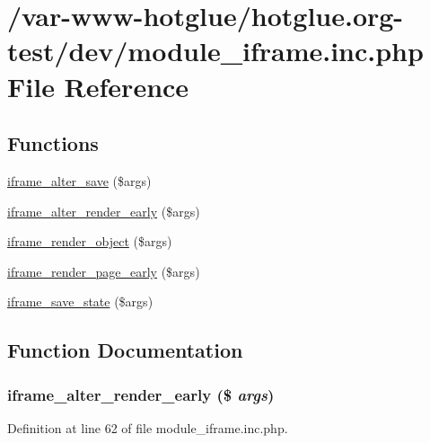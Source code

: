 \hypertarget{module__iframe_8inc_8php}{
\section{/var-\/www-\/hotglue/hotglue.org-\/test/dev/module\_\-iframe.inc.php File Reference}
\label{module__iframe_8inc_8php}
}
\subsection*{Functions}
\begin{DoxyCompactItemize}
\item 
\hyperlink{module__iframe_8inc_8php_a2db93d83522681e256287e019fe40abc}{iframe\_\-alter\_\-save} (\$args)
\item 
\hyperlink{module__iframe_8inc_8php_a7a5d09a45f06d9fd866f3c7679c14db2}{iframe\_\-alter\_\-render\_\-early} (\$args)
\item 
\hyperlink{module__iframe_8inc_8php_a40856482f79fb837bc538e8eed66aff4}{iframe\_\-render\_\-object} (\$args)
\item 
\hyperlink{module__iframe_8inc_8php_ad4d8fd8256a19beb570193c2886659e5}{iframe\_\-render\_\-page\_\-early} (\$args)
\item 
\hyperlink{module__iframe_8inc_8php_a3034fcc475334b511b91932918fcfe57}{iframe\_\-save\_\-state} (\$args)
\end{DoxyCompactItemize}


\subsection{Function Documentation}
\hypertarget{module__iframe_8inc_8php_a7a5d09a45f06d9fd866f3c7679c14db2}{
\subsubsection[{iframe\_\-alter\_\-render\_\-early}]{\setlength{\rightskip}{0pt plus 5cm}iframe\_\-alter\_\-render\_\-early (\$ {\em args})}}
\label{module__iframe_8inc_8php_a7a5d09a45f06d9fd866f3c7679c14db2}


Definition at line 62 of file module\_\-iframe.inc.php.

